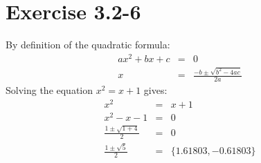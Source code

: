 \documentclass{article}
\begin{document}
\section*{Exercise 3.2-6}

By definition of the quadratic formula:
\begin{eqnarray*}
a x^2 + b x + c & = & 0 \\
x & = & \frac{-b \pm \sqrt{b^2 - 4ac}}{2a}
\end{eqnarray*}
Solving the equation $x^2 = x + 1$ gives:
\begin{eqnarray*}
	x^2 & = & x + 1 \\
	x^2 - x - 1 & = & 0 \\
	\frac{1 \pm \sqrt{1 + 4}}{2} & = & 0 \\
	\frac{1 \pm \sqrt{5}}{2} & = & \{1.61803, -0.61803 \}
\end{eqnarray*}
\end{document}
